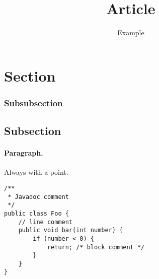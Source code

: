 \documentclass{hasel_article}
\title{Article}
\subtitle{Example}
\begin{document}
\maketitle

\section{Section}
%
\subsubsection{Subsubsection}

\subsection{Subsection}
%
\paragraph{Paragraph.} Always with a point.

\begin{lstlisting}[caption=An example code snippet]
/**
 * Javadoc comment
 */
public class Foo {
	// line comment
	public void bar(int number) {
		if (number < 0) {
			return; /* block comment */
		}
	}
}
\end{lstlisting}



\end{document}
